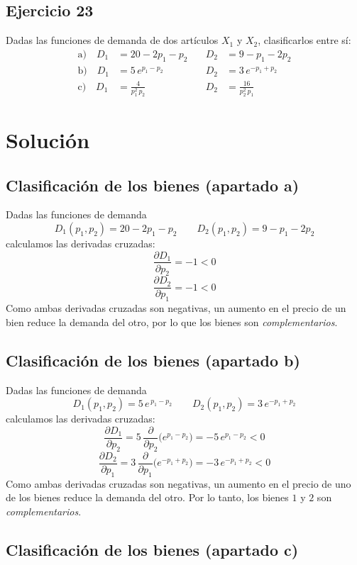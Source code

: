 \documentclass{article}
\begin{document}
\newpage

\subsection{Ejercicio 23}
Dadas las funciones de demanda de dos artículos \(X_1\) y \(X_2\), clasificarlos entre sí:
\[
\begin{aligned}
\text{a)}\quad D_1 &= 20 - 2p_1 - p_2
\quad &D_2 &= 9 - p_1 - 2p_2 \\
\text{b)}\quad D_1 &= 5\,e^{p_1 - p_2}
\quad &D_2 &= 3\,e^{-p_1 + p_2} \\
\text{c)}\quad D_1 &= \frac{4}{p_1^2\,p_2}
\quad &D_2 &= \frac{16}{p_2^2\,p_1}
\end{aligned}
\]

\newpage
\section*{Solución}

\subsection*{Clasificación de los bienes (apartado a)}

Dadas las funciones de demanda
\[
D_1(p_1,p_2)=20-2p_1-p_2
\qquad
D_2(p_1,p_2)=9-p_1-2p_2
\]
calculamos las derivadas cruzadas:
\[
\frac{\partial D_1}{\partial p_2}
=-1<0
\]
\[
\frac{\partial D_2}{\partial p_1}
=-1<0
\]
Como ambas derivadas cruzadas son negativas, un aumento en el precio de un bien reduce la demanda del otro, por lo que {\color{teal}los bienes son \emph{complementarios}}.

\subsection*{Clasificación de los bienes (apartado b)}

Dadas las funciones de demanda
\[
D_1(p_1,p_2)=5\,e^{\,p_1 - p_2}
\qquad
D_2(p_1,p_2)=3\,e^{-p_1 + p_2}
\]
calculamos las derivadas cruzadas:
\[
\frac{\partial D_1}{\partial p_2}
=5\,\frac{\partial}{\partial p_2}\bigl(e^{p_1-p_2}\bigr)
=-5\,e^{p_1-p_2}<0
\]
\[
\frac{\partial D_2}{\partial p_1}
=3\,\frac{\partial}{\partial p_1}\bigl(e^{-p_1+p_2}\bigr)
=-3\,e^{-p_1+p_2}<0
\]
Como ambas derivadas cruzadas son negativas, un aumento en el precio de uno de los bienes reduce la demanda del otro. {\color{teal}Por lo tanto, los bienes \(1\) y \(2\) son \emph{complementarios}}.

\subsection*{Clasificación de los bienes (apartado c)}
\end{document}
